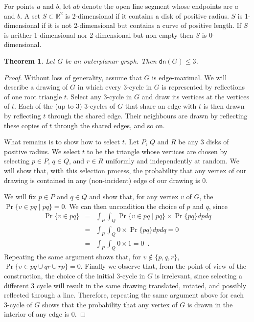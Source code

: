 \documentclass{article}
\newcommand{\dn}{\mathsf{dn}}
\newcommand{\R}{\mathbb{R}}
\newtheorem{thm}{Theorem}
\begin{document}
For points $a$ and $b$, let $ab$ denote the open line segment whose
endpoints are $a$ and $b$.  A set $S\subset\R^2$ is 2-dimensional if
it contains a disk of positive radius.  $S$ is 1-dimensional if it is
not 2-dimensional but contains a curve of positive length.  If $S$ is
neither 1-dimensional nor 2-dimensional but non-empty then $S$ is
0-dimensional.

\begin{thm} 
Let $G$ be an outerplanar graph.  Then $\dn(G) \le 3$.
\end{thm}

\begin{proof}
Without loss of generality, assume that $G$ is edge-maximal.  We will
describe a drawing of $G$ in which every 3-cycle in $G$ is represented
by reflections of one root triangle $t$.  Select any 3-cycle in $G$
and draw its vertices at the vertices of $t$.  Each of the (up to 3)
3-cycles of $G$ that share an edge with $t$ is then drawn by reflecting
$t$ through the shared edge.  Their neighbours are drawn by reflecting
these copies of $t$ through the shared edges, and so on.

What remains is to show how to select $t$.  Let $P$, $Q$ and $R$ be
any 3 disks of positive radius.  We select $t$ to be the triangle
whose vertices are chosen by selecting $p\in P$, $q\in Q$, and $r\in
R$ uniformly and independently at random.  We will show that, with
this selection process, the probability that any vertex of our drawing
is contained in any (non-incident) edge of our drawing is 0.

We will fix $p\in P$ and $q\in Q$ and show that, for any vertex $v$
of $G$, the $\Pr\{v\in pq\mid pq\} = 0$.  We can then uncondition the
choice of $p$ and $q$, since
\begin{eqnarray*}
  \Pr\{v\in pq\} 
    & = & \int_P\int_Q\Pr\{v\in pq\mid pq\}\times\Pr\{pq\}dpdq \\
    & = & \int_P\int_Q 0\times\Pr\{pq\}dpdq = 0 \\ 
    & = & \int_P\int_Q 0\times1 = 0 \enspace .
\end{eqnarray*}
Repeating the same argument shows that, for $v\not\in\{p,q,r\}$,
$\Pr\{v\in pq\cup qr \cup rp\} = 0$.  Finally we observe that, from
the point of view of the construction, the choice of the initial
3-cycle in $G$ is irrelevant, since selecting a different 3 cycle will
result in the same drawing translated, rotated, and possibly reflected
through a line.  Therefore, repeating the same argument above for each
3-cycle of $G$ shows
that the probability that any vertex of $G$ is drawn in the interior
of any edge is 0.


\end{proof}
\end{document}
